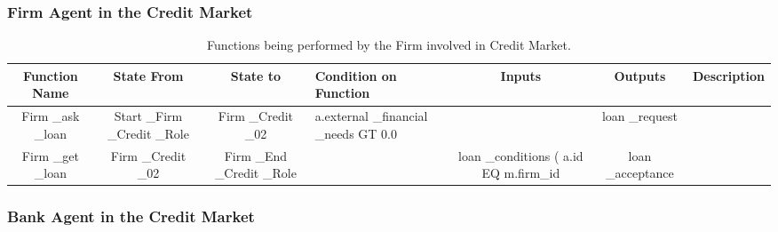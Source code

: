 \subsubsection{Firm Agent in the Credit Market}


\begin{landscape}
\begin{table}[!htb]\caption{Functions being performed by the Firm involved in Credit Market.}
\begin{center}
\begin{tabular}{|c|c|c|l|c|c|l|}
\hline
Function Name & State From & State to & Condition on Function & Inputs & Outputs & Description \\
\hline
{\parbox[l]{3cm}{Firm \_ask \_loan}}&
{\parbox[l]{3cm}{Start \_Firm \_Credit \_Role}}&
{\parbox[l]{3cm}{Firm \_Credit \_02}}&
{\parbox[l]{3cm}{a.external \_financial \_needs GT 0.0}}
&
&loan \_request &
\\
\hline

{\parbox[l]{3cm}{Firm \_get \_loan}}& {\parbox[l]{3cm}{Firm \_Credit
\_02}}& {\parbox[l]{3cm}{Firm \_End \_Credit \_Role}}&
&{\parbox[l]{3cm}{loan \_conditions ( a.id EQ m.firm\_id}} &
{\parbox[l]{3cm}{loan \_acceptance}}&\\
\hline


\end{tabular}\end{center}\label{tab:creditbankfn}
\end{table}
\end{landscape}

\subsubsection{Bank Agent in the Credit Market}



